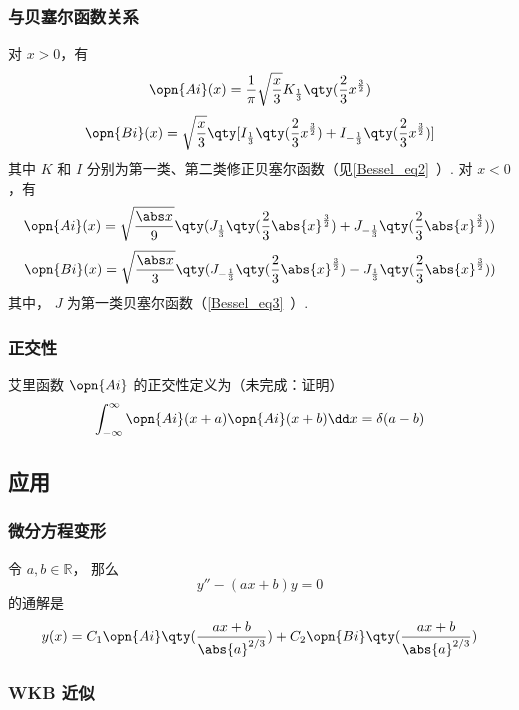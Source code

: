 \subsubsection{与贝塞尔函数关系}
对 $x>0$，有
\begin{equation}
\opn{Ai}(x)=\frac1\pi \sqrt{\frac x3} K_{\frac13} \qty(\frac23 x^{\frac32})
\end{equation}\begin{equation}
\opn{Bi}(x)=\sqrt{\frac x3}\qty[I_{\frac13}\qty(\frac23 x^{\frac32})+I_{-\frac13}\qty(\frac23 x^{\frac32})]
\end{equation}
其中 $K$ 和 $I$ 分别为第一类、第二类修正贝塞尔函数（见\autoref{Bessel_eq2}~）.
对 $x<0$，有
\begin{equation}
\opn{Ai}(x)=\sqrt{\frac{\abs x}{9}}\qty(J_{\frac13}\qty(\frac23 \abs{x}^{\frac32})+J_{-\frac13}\qty(\frac23 \abs{x}^{\frac32}))
\end{equation}
\begin{equation}
\opn{Bi}(x)=\sqrt{\frac{\abs x}{3}}\qty(J_{-\frac13}\qty(\frac23 \abs{x}^{\frac32})-J_{\frac13}\qty(\frac23 \abs{x}^{\frac32}))
\end{equation}
其中， $J$ 为第一类贝塞尔函数（\autoref{Bessel_eq3}~）.
\subsubsection{正交性}
艾里函数 $\opn{Ai}$ 的正交性定义为（未完成：证明）
\begin{equation}
\int_{-\infty}^\infty\opn{Ai}(x+a)\opn{Ai}(x+b)\dd x=\delta(a-b)
\end{equation}
\subsection{应用}
\subsubsection{微分方程变形}
令 $a, b\in \mathbb R$， 那么
\begin{equation}
y'' - (ax + b) y = 0
\end{equation}
的通解是
\begin{equation}\label{AiryF_eq1}
y(x) = C_1\opn{Ai}\qty(\frac{ax+b}{\abs{a}^{2/3}}) + C_2 \opn{Bi}\qty(\frac{ax+b}{\abs{a}^{2/3}})
\end{equation}
\subsubsection{WKB 近似}
